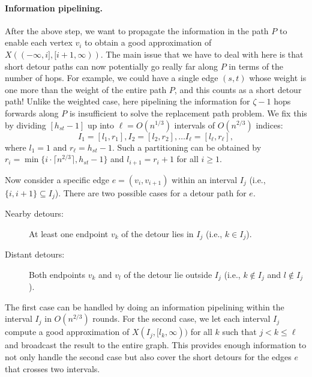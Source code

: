 \paragraph{Information pipelining.} After the above step,  we want to propagate the information in the path $P$ to enable each vertex $v_i$ to obtain a good approximation of $X((-\infty,i], [i+1, \infty))$. The main issue that we have to deal with here is that short detour paths can now potentially go really far along $P$ in terms of the number of hops. For example, we could have a single edge $(s,t)$ whose weight is one more than the weight of the entire path $P$, and this counts as a short detour path! Unlike the weighted case, here pipelining the information for $\zeta - 1$ hops forwards along $P$ is insufficient to solve the replacement path problem. We fix this by  dividing $[h_{st}-1]$ up into $\ell =O(n^{1/3})$ intervals of $O(n^{2/3})$ indices: \[I_1=[l_1,r_1], I_2=[l_2,r_2], \ldots  I_\ell=[l_\ell,r_\ell],\] 
where $l_1 = 1$ and $r_\ell = h_{st}-1$. Such a partitioning can be obtained by $r_i = \min\{i \cdot \lceil n^{2/3} \rceil, h_{st}-1\}$ and $l_{i+1} = r_i+1$ for all $i \geq 1$.

Now consider a specific edge $e=(v_i, v_{i+1})$ within an interval $I_j$ (i.e., $\{i, i+1\} \subseteq I_j$). There are two possible cases for a detour path for $e$.
\begin{description}
    \item[Nearby detours:] At least one endpoint $v_k$ of the detour lies in $I_j$ (i.e., $k \in I_j$).
    \item[Distant detours:] Both endpoints $v_k$ and $v_l$ of the detour lie outside $I_j$ (i.e., $k \notin I_j$ and $l \notin I_j$).
\end{description}
The first case can be handled by doing an information pipelining within the interval $I_j$ in $O(n^{2/3})$ rounds. For the second case, we let each interval $I_j$ compute a good approximation of $X( I_j, [l_k, \infty))$ for all $k$ such that $j < k \leq \ell$ and broadcast the result to the entire graph. This provides enough information to not only handle the second case but also cover the short detours for the edges $e$ that crosses two intervals.


